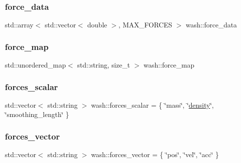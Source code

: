 \subsubsection{\texorpdfstring{force\+\_\+data}{force\_data}}
{\footnotesize\ttfamily std\+::array$<$ std\+::vector$<$ double $>$, M\+A\+X\+\_\+\+F\+O\+R\+C\+ES $>$ wash\+::force\+\_\+data}

\mbox{\label{namespacewash_a77bf373c7f48aed54e36e089a47a74ab}} 
\subsubsection{\texorpdfstring{force\+\_\+map}{force\_map}}
{\footnotesize\ttfamily std\+::unordered\+\_\+map$<$ std\+::string, size\+\_\+t $>$ wash\+::force\+\_\+map}

\mbox{\label{namespacewash_a9c297685f13f82d6f804157081b56402}} 
\subsubsection{\texorpdfstring{forces\+\_\+scalar}{forces\_scalar}}
{\footnotesize\ttfamily std\+::vector$<$ std\+::string $>$ wash\+::forces\+\_\+scalar = \{ \char`\"{}mass\char`\"{}, \char`\"{}\mbox{\hyperlink{3d__fluid__sim_2fluid__sim_8cpp_a140d94d7edb97c062961056d1926a2db}{density}}\char`\"{}, \char`\"{}smoothing\+\_\+length\char`\"{} \}}

\mbox{\label{namespacewash_a0dce58e51e269cb2298f5ec6648f28ab}} 
\subsubsection{\texorpdfstring{forces\+\_\+vector}{forces\_vector}}
{\footnotesize\ttfamily std\+::vector$<$ std\+::string $>$ wash\+::forces\+\_\+vector = \{ \char`\"{}pos\char`\"{}, \char`\"{}vel\char`\"{}, \char`\"{}acc\char`\"{} \}}

\mbox{\label{namespacewash_ae78f9afe5afb195bb7756b8d5214079d}} 
